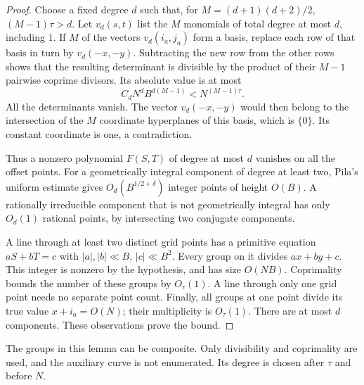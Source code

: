 \begin{proof}
Choose a fixed degree \(d\) such that, for
\(M=(d+1)(d+2)/2\), \((M-1)\tau>d\).
Let \(v_d(s,t)\) list the \(M\) monomials of total degree
at most \(d\), including \(1\).
If \(M\) of the vectors \(v_d(i_a,j_a)\) form a basis,
replace each row of that basis in turn by \(v_d(-x,-y)\).
Subtracting the new row from the other rows shows that
the resulting determinant is divisible by the product
of their \(M-1\) pairwise coprime divisors.
Its absolute value is at most
\[
 C_dN^dB^{d(M-1)}<N^{(M-1)\tau}.
\]
All the determinants vanish.
The vector \(v_d(-x,-y)\) would then belong to the
intersection of the \(M\) coordinate hyperplanes of
this basis, which is \(\{0\}\). Its constant coordinate
is one, a contradiction.

Thus a nonzero polynomial \(F(S,T)\) of degree at most
\(d\) vanishes on all the offset points.
For a geometrically integral component of degree at least
two, Pila's uniform estimate
\cite[Theorem~A]{pila1995} gives
\(O_d(B^{1/2+\delta})\) integer points of height \(O(B)\).
A rationally irreducible component that is not geometrically
integral has only \(O_d(1)\) rational points, by intersecting
two conjugate components.

A line through at least two distinct grid points has a
primitive equation \(aS+bT=c\) with
\(|a|,|b|\ll B\), \(|c|\ll B^2\).
Every group on it divides \(ax+by+c\).
This integer is nonzero by the hypothesis, and has size
\(O(NB)\). Coprimality bounds the number of these groups
by \(O_\tau(1)\). A line through only one grid point
needs no separate point count.
Finally, all groups at one point divide its true value
\(x+i_a=O(N)\); their multiplicity is \(O_\tau(1)\).
There are at most \(d\) components. These observations
prove the bound.
\end{proof}

The groups in this lemma can be composite. Only divisibility
and coprimality are used, and the auxiliary curve is not
enumerated. Its degree is chosen after \(\tau\) and before
\(N\).

